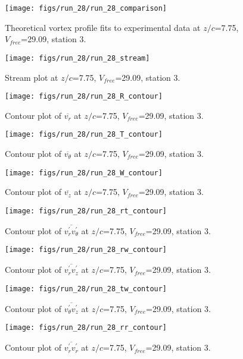 \begin{figure}[H]
\centering
\texttt{[image: figs/run\_28/run\_28\_comparison]}
\caption{Theoretical vortex profile fits to experimental data at $z/c$=7.75, $V_{free}$=29.09, station 3.}
\end{figure}


\begin{figure}[H]
\centering
\texttt{[image: figs/run\_28/run\_28\_stream]}
\caption{Stream plot at $z/c$=7.75, $V_{free}$=29.09, station 3.}
\end{figure}


\begin{figure}[H]
\centering
\texttt{[image: figs/run\_28/run\_28\_R\_contour]}
\caption{Contour plot of $\overline{v_{r}}$ at $z/c$=7.75, $V_{free}$=29.09, station 3.}
\end{figure}


\begin{figure}[H]
\centering
\texttt{[image: figs/run\_28/run\_28\_T\_contour]}
\caption{Contour plot of $\overline{v_{\theta}}$ at $z/c$=7.75, $V_{free}$=29.09, station 3.}
\end{figure}


\begin{figure}[H]
\centering
\texttt{[image: figs/run\_28/run\_28\_W\_contour]}
\caption{Contour plot of $\overline{v_{z}}$ at $z/c$=7.75, $V_{free}$=29.09, station 3.}
\end{figure}


\begin{figure}[H]
\centering
\texttt{[image: figs/run\_28/run\_28\_rt\_contour]}
\caption{Contour plot of $\overline{v_{r}^{\prime} v_{\theta}^{\prime}}$ at $z/c$=7.75, $V_{free}$=29.09, station 3.}
\end{figure}


\begin{figure}[H]
\centering
\texttt{[image: figs/run\_28/run\_28\_rw\_contour]}
\caption{Contour plot of $\overline{v_{r}^{\prime} v_{z}^{\prime}}$ at $z/c$=7.75, $V_{free}$=29.09, station 3.}
\end{figure}


\begin{figure}[H]
\centering
\texttt{[image: figs/run\_28/run\_28\_tw\_contour]}
\caption{Contour plot of $\overline{v_{\theta}^{\prime} v_{z}^{\prime}}$ at $z/c$=7.75, $V_{free}$=29.09, station 3.}
\end{figure}


\begin{figure}[H]
\centering
\texttt{[image: figs/run\_28/run\_28\_rr\_contour]}
\caption{Contour plot of $\overline{v_{r}^{\prime} v_{r}^{\prime}}$ at $z/c$=7.75, $V_{free}$=29.09, station 3.}
\end{figure}


